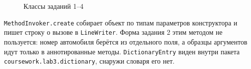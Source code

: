 \documentclass[a4paper,14pt]{extarticle}
\begin{document}
\begin{figure}[H]
{%
    }
    \caption{Классы заданий 1--4}
    \label{fig:domain}
\end{figure}

\texttt{MethodInvoker.create} собирает объект по типам параметров конструктора и пишет строку о вызове в \texttt{LineWriter}. Форма задания 2 этим методом не пользуется: номер автомобиля берётся из отдельного поля, а образцы аргументов идут только в аннотированные методы. \texttt{DictionaryEntry} виден внутри пакета \texttt{coursework.lab3.dictionary}, снаружи словаря его нет.
\end{document}
